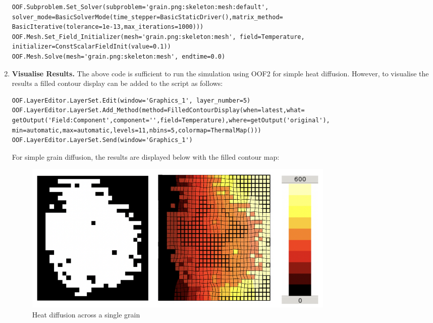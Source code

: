 \documentclass{article}
\begin{document}
\begin{enumerate}
\lstset{language=Python}
\begin{lstlisting}
OOF.Subproblem.Set_Solver(subproblem='grain.png:skeleton:mesh:default', solver_mode=BasicSolverMode(time_stepper=BasicStaticDriver(),matrix_method=
BasicIterative(tolerance=1e-13,max_iterations=1000)))
OOF.Mesh.Set_Field_Initializer(mesh='grain.png:skeleton:mesh', field=Temperature, initializer=ConstScalarFieldInit(value=0.1))
OOF.Mesh.Solve(mesh='grain.png:skeleton:mesh', endtime=0.0)
\end{lstlisting}

\item \textbf{Visualise Results.} The above code is sufficient to run the simulation using OOF2 for simple heat diffusion. However, to visualise the results a filled contour display can be added to the script as follows:

\lstset{language=Python}
\begin{lstlisting}
OOF.LayerEditor.LayerSet.Edit(window='Graphics_1', layer_number=5)
OOF.LayerEditor.LayerSet.Add_Method(method=FilledContourDisplay(when=latest,what=
getOutput('Field:Component',component='',field=Temperature),where=getOutput('original'),
min=automatic,max=automatic,levels=11,nbins=5,colormap=ThermalMap()))
OOF.LayerEditor.LayerSet.Send(window='Graphics_1')
\end{lstlisting}

For simple grain diffusion, the results are displayed below with the filled contour map:

\begin{figure}[htbp]
   \centering
   \includegraphics[width=6in]{Figures/grain_heat_diffusion} 
   \caption{Heat diffusion across a single grain}
   \label{fig:model}
\end{figure}

\end{enumerate}
\end{document}
